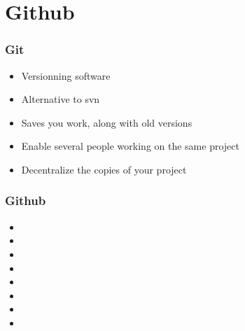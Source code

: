 \documentclass{beamer}
\begin{document}
\begin{frame}[t]{}
    
\end{frame}
\section{Github}
\begin{frame}
\frametitle{Git}
\begin{itemize}
\item Versionning software
\item Alternative to svn
\item Saves you work, along with old versions
\item Enable several people working on the same project
\item Decentralize the copies of your project
\end{itemize}
\end{frame}


\begin{frame}
\frametitle{Github}
\begin{itemize}
\item 
\item 
\item 
\item 
\item 
\item 
\item 
\item 
\end{itemize}
\end{frame}
\end{document}
